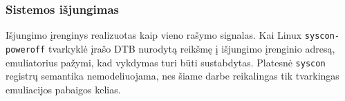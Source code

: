 \subsubsection{Sistemos išjungimas}

Išjungimo įrenginys realizuotas kaip vieno rašymo signalas. Kai Linux \texttt{syscon-poweroff} tvarkyklė įrašo DTB nurodytą reikšmę į išjungimo įrenginio adresą, emuliatorius pažymi, kad vykdymas turi būti sustabdytas. Platesnė \texttt{syscon} registrų semantika nemodeliuojama, nes šiame darbe reikalingas tik tvarkingas emuliacijos pabaigos kelias.
